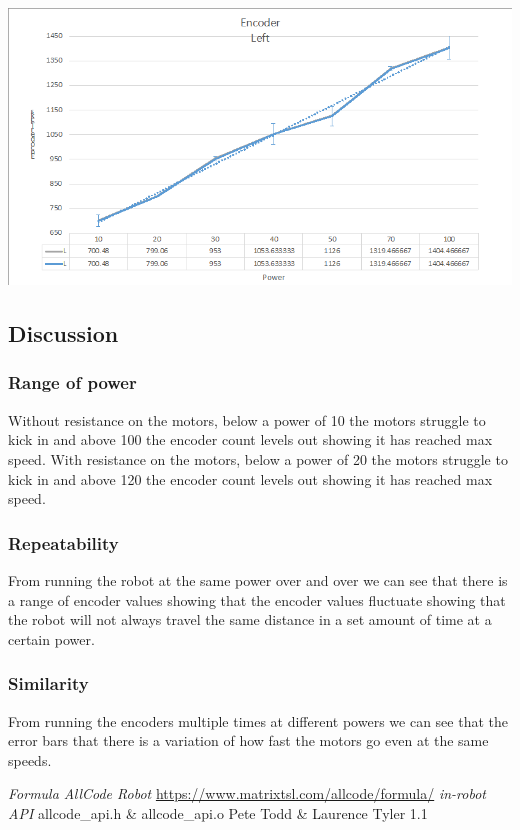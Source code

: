\documentclass[11pt,a4paper,titlepage]{article}
\begin{document}
	\includegraphics[width=\textwidth,height=\textheight,keepaspectratio]{EncodersLeft}

\subsection{Discussion}
	\subsubsection{Range of power}
		Without resistance on the motors, below a power of 10 the motors struggle to kick in and above 100 the encoder count levels out showing it has reached max speed.
		With resistance on the motors, below a power of 20 the motors struggle to kick in and above 120 the encoder count levels out showing it has reached max speed.
	\subsubsection{Repeatability}
	
		From running the robot at the same power over and over we can see that there is a range of encoder values showing that the encoder values fluctuate showing that the robot will not always travel the same distance in a set amount of time at a certain power.
		
	\subsubsection{Similarity}
	
	From running the encoders multiple times at different powers we can see that the error bars that there is a variation of how fast the motors go even at the same speeds. 

\clearpage
{}
\begin{thebibliography}{5}
 \emph{Formula AllCode Robot}
\url{https://www.matrixtsl.com/allcode/formula/}
 \emph{in-robot API}
allcode\_api.h \& allcode\_api.o
Pete Todd \& Laurence Tyler 1.1
\end{thebibliography}
\clearpage

\label{thelastpage}
\end{document}
